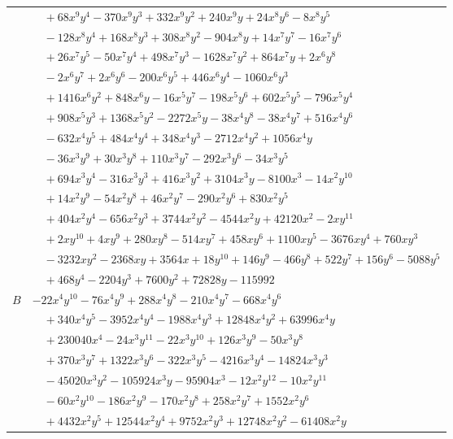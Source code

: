 \documentclass[11pt]{article}
\begin{document}
\begin{longtable}{@{}ll@{}}
 & $\quad +68x^{9}y^{4}-370x^{9}y^{3}+332x^{9}y^{2}+240x^{9}y+24x^{8}y^{6}-8x^{8}y^{5}$\\
 & $\quad -128x^{8}y^{4}+168x^{8}y^{3}+308x^{8}y^{2}-904x^{8}y+14x^{7}y^{7}-16x^{7}y^{6}$\\
 & $\quad +26x^{7}y^{5}-50x^{7}y^{4}+498x^{7}y^{3}-1628x^{7}y^{2}+864x^{7}y+2x^{6}y^{8}$\\
 & $\quad -2x^{6}y^{7}+2x^{6}y^{6}-200x^{6}y^{5}+446x^{6}y^{4}-1060x^{6}y^{3}$\\
 & $\quad +1416x^{6}y^{2}+848x^{6}y-16x^{5}y^{7}-198x^{5}y^{6}+602x^{5}y^{5}-796x^{5}y^{4}$\\
 & $\quad +908x^{5}y^{3}+1368x^{5}y^{2}-2272x^{5}y-38x^{4}y^{8}-38x^{4}y^{7}+516x^{4}y^{6}$\\
 & $\quad -632x^{4}y^{5}+484x^{4}y^{4}+348x^{4}y^{3}-2712x^{4}y^{2}+1056x^{4}y$\\
 & $\quad -36x^{3}y^{9}+30x^{3}y^{8}+110x^{3}y^{7}-292x^{3}y^{6}-34x^{3}y^{5}$\\
 & $\quad +694x^{3}y^{4}-316x^{3}y^{3}+416x^{3}y^{2}+3104x^{3}y-8100x^{3}-14x^{2}y^{10}$\\
 & $\quad +14x^{2}y^{9}-54x^{2}y^{8}+46x^{2}y^{7}-290x^{2}y^{6}+830x^{2}y^{5}$\\
 & $\quad +404x^{2}y^{4}-656x^{2}y^{3}+3744x^{2}y^{2}-4544x^{2}y+42120x^{2}-2xy^{11}$\\
 & $\quad +2xy^{10}+4xy^{9}+280xy^{8}-514xy^{7}+458xy^{6}+1100xy^{5}-3676xy^{4}+760xy^{3}$\\
 & $\quad -3232xy^{2}-2368xy+3564x+18y^{10}+146y^{9}-466y^{8}+522y^{7}+156y^{6}-5088y^{5}$\\
 & $\quad +468y^{4}-2204y^{3}+7600y^{2}+72828y-115992$\\
$B$ & $-22x^{4}y^{10}-76x^{4}y^{9}+288x^{4}y^{8}-210x^{4}y^{7}-668x^{4}y^{6}$\\
 & $\quad +340x^{4}y^{5}-3952x^{4}y^{4}-1988x^{4}y^{3}+12848x^{4}y^{2}+63996x^{4}y$\\
 & $\quad +230040x^{4}-24x^{3}y^{11}-22x^{3}y^{10}+126x^{3}y^{9}-50x^{3}y^{8}$\\
 & $\quad +370x^{3}y^{7}+1322x^{3}y^{6}-322x^{3}y^{5}-4216x^{3}y^{4}-14824x^{3}y^{3}$\\
 & $\quad -45020x^{3}y^{2}-105924x^{3}y-95904x^{3}-12x^{2}y^{12}-10x^{2}y^{11}$\\
 & $\quad -60x^{2}y^{10}-186x^{2}y^{9}-170x^{2}y^{8}+258x^{2}y^{7}+1552x^{2}y^{6}$\\
 & $\quad +4432x^{2}y^{5}+12544x^{2}y^{4}+9752x^{2}y^{3}+12748x^{2}y^{2}-61408x^{2}y$\\

\end{longtable}
\end{document}
